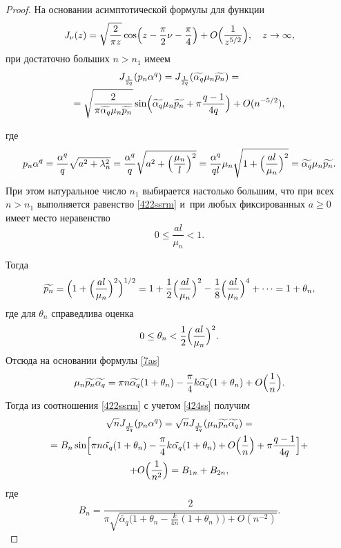 \smallskip

\begin{proof} На основании асимптотической формулы
\cite[Eq. 7.13(3)]{safina:vtf} для функции
 \begin{equation}
\label{421ss} J_\nu(z)=\sqrt{\frac{2}{\pi
z}}\cos\Bigl(z-\frac{\pi}{2}\nu-\frac{\pi}{4}\Bigr)+O\Bigl(\frac{1}{z^{{5}/{2}}}\Bigr),
 \quad  z\rightarrow \infty,
\end{equation}
при достаточно больших $n>n_{1}$ имеем
\begin{multline}
\label{422ssrm}
J_{\frac{1}{2q}}(p_{n}\alpha^{q})=J_{\frac{1}{2q}}(\widetilde{\alpha_{q}}\mu_{n}\widetilde{p_{n}}) =
\\ =\sqrt{\frac{2}{\pi
\widetilde{\alpha_{q}}\mu_{n}\widetilde{p_{n}}}}
\sin\Bigl(\widetilde{\alpha_{q}}\mu_{n}\widetilde{p_{n}}+\pi\frac{q-1}{4q}\Bigr)+O(n^{-{5}/{2}}),
\end{multline}



\noindent
где 
$$
p_{n}\alpha^{q}=\frac{\alpha^q}{q}\sqrt{a^{2}+\lambda_{n}^{2}}=\frac{\alpha^{q}}{q}\sqrt{a^{2}+
\Bigl(\frac{\mu_{n}}{l}\Bigr)^2}
=\frac{\alpha^{q}}{ql}\mu_{n}\sqrt{1+
\Bigl(\frac{al}{\mu_{n}}\Bigr)^2}=\widetilde{\alpha_{q}}\mu_{n}\widetilde{p_{n}}.
$$
При этом натуральное число $n_{1}$ выбирается настолько большим, что
при всех $n>n_{1}$ выполняется равенство \eqref{422ssrm} и~при любых
фиксированных $a\geq 0$ имеет место неравенство
$$
0\leq \frac{al}{\mu_{n}}<1.
$$

Тогда
\begin{equation*}
\widetilde{p_{n}}=\Bigl(1+\Bigl(\frac{al}{\mu_{n}}\Bigr)^{2}\Bigr)^{{1}/{2}}
=1+\frac{1}{2}\Bigl(\frac{al}{\mu_{n}}\Bigr)^{2}-\frac{1}{8}\Bigl(\frac{al}{\mu_{n}}\Bigr)^{4}+ \dots =1+\theta_{n},
\end{equation*}
где для $\theta_{n}$ справедлива оценка
\begin{equation}
\label{423ssrm} 0\leq
\theta_{n}<\frac{1}{2}\Bigl(\frac{al}{\mu_{n}}\Bigr)^{2}.
\end{equation}
Отсюда на основании формулы \eqref{7as}
\begin{equation}
\label{424ss} \mu_{n}\widetilde{p_{n}}\widetilde{\alpha_{q}}=\pi n
\widetilde{\alpha_{q}}(1+\theta_{n})-\frac{\pi}{4}k\widetilde{\alpha_{q}}(1+\theta_{n})+O\Bigl(\frac{1}{n}\Bigr).
\end{equation}
Тогда из соотношения \eqref{422ssrm} с учетом \eqref{424ss} получим
\begin{multline*}
\sqrt{n}J_{\frac{1}{2q}}(p_{n}\alpha^{q})=\sqrt{n}J_{\frac{1}{2q}}(\mu_{n}\widetilde{p_n}\widetilde{\alpha_q})=\\
=
B_{n}\sin\Bigl[\pi n \tilde{\alpha_{q}}(1+\theta_{n})-\frac{\pi}{4}k\tilde{\alpha_{q}}(1+\theta_{n})+O\Bigl(\frac{1}{n}\Bigr)+\pi\frac{q-1}{4q}\Bigr]+
\\
+O\Bigl(\frac{1}{n^{2}}\Bigr) =B_{1n}+B_{2n},
\end{multline*}
где
\begin{equation*}
B_{n}=\frac{2}{\pi\sqrt{\widetilde{\alpha_{q}} \bigl(1+\theta_{n}-\frac{k}{4n}(1+\theta_{n})\bigr)+O(n^{-2})}}.
\end{equation*}


\end{proof}

